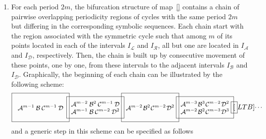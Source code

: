 \documentclass[12pt]{article}
\renewcommand{\L}{{\mathcal L}}
\newcommand{\A}{{\mathcal A}}
\newcommand{\B}{{\mathcal B}}
\newcommand{\C}{{\mathcal C}}
\newcommand{\D}{{\mathcal D}}
\newcommand{\R}{{\mathcal R}}
\begin{document}
\begin{enumerate}
  \item
        For each period $2m$, the bifurcation structure of map~\eqref{}
        contains a chain of pairwise overlapping periodicity regions of
        cycles with the same period $2m$ but differing in the corresponding
        symbolic sequences. Each chain start with the region associated with
        the symmetric cycle such that among $m$ of its points located in
        each of the intervals $I_\L$ and $I_\R$, all but one are located in
        $I_\A$ and $I_\D$, respectively. Then, the chain is built up by
        consecutive movement of these points, one by one, from these
        intervals to the adjacent intervals $I_\B$ and $I_\D$. Graphically,
        the beginning of each chain can be illustrated by the following
        scheme:
        \begin{equation}
          \fbox{
            \begin{minipage}[c][3.5em][c]{7em}\small\centering
              $\A^{m-1}\:\B\:\C^{m-1}\:\D$
            \end{minipage}
          }
          \hspace*{-1ex}
          \fbox{
            \begin{minipage}[c][2.5em][c]{7em}\small\centering
              $\A^{m-2}\:\B^2\:\C^{m-1}\:\D$\\
              $\A^{m-1}\:\B  \:\C^{m-2}\:\D^2$
            \end{minipage}
          }
          \hspace*{-1ex}
          \fbox{
            \begin{minipage}[c][3.5em][c]{7em}\small\centering
              $\A^{m-2}\:\B^2\:\C^{m-2}\:\D^2$
            \end{minipage}
          }
          \hspace*{-1ex}
          \fbox{
            \begin{minipage}[c][2.5em][c]{7em}\small\centering
              $\A^{m-3}\:\B^3\:\C^{m-2}\:\D^2$\\
              $\A^{m-2}\:\B^2\:\C^{m-3}\:\D^3$
            \end{minipage}
          }
          \hspace*{-1ex}
          \fbox[LTB]{
            \begin{minipage}[c][3.5em][c]{1ex}\small
              \dots
            \end{minipage}
          }
        \end{equation}
        and a generic step in this scheme can be specified as follows

\end{enumerate}
\end{document}
